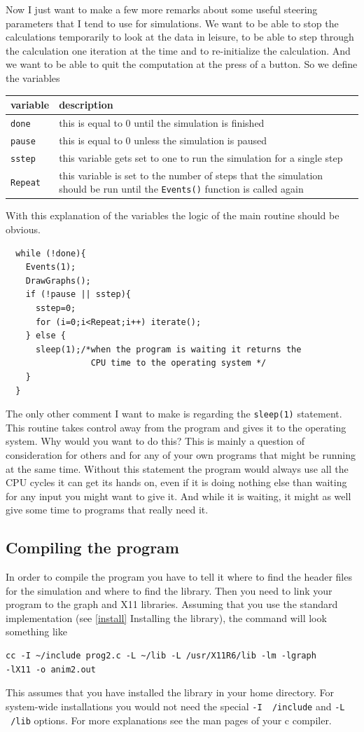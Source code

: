 \documentclass[12pt,letterpaper]{article}
\begin{document}
Now I just want to make a few more remarks about some useful steering
parameters that I tend to use for simulations. We want to be able to
stop the calculations temporarily to look at the data in leisure,
to be able to step through the calculation one iteration at the time and
to re-initialize the calculation. And we want to be able to quit the
computation at the press of a button. So we define the variables
\begin{center}
\begin{tabular}{|l|p{8cm}|}
\hline
variable & description \\
\hline
\texttt{done} & this is equal to 0 until the simulation is finished\\
\texttt{pause}& this is equal to 0 unless the simulation is paused\\
\texttt{sstep}& this variable gets set to one to run the simulation
for a single step\\
\texttt{Repeat}& this variable is set to the number of steps that the
simulation should be run until the \texttt{Events()} function is
called again\\
\hline
\end{tabular}
\end{center}
With this explanation of the variables the logic of the main routine
should be obvious.
\begin{verbatim}
  while (!done){
    Events(1);
    DrawGraphs();
    if (!pause || sstep){
      sstep=0;
      for (i=0;i<Repeat;i++) iterate();
    } else {
      sleep(1);/*when the program is waiting it returns the 
                 CPU time to the operating system */
    }
  }
\end{verbatim}
The only other comment I want to make is regarding the
\texttt{sleep(1)} statement. This routine takes control away from the
program and gives it to the operating system. Why would you want to do
this? This is mainly a question of consideration for others and for
any of your own programs that might be running at the same
time. Without this statement the program would always use all the CPU
cycles it can get its hands on, even if it is doing nothing else than
waiting for any input you might want to give it. And while it is
waiting, it might as well give some time to programs that really
need it.

\subsection{Compiling the program}
In order to compile the program you have to tell it where to find the
header files for the simulation and where to find the library. Then
you need to link your program to the graph and X11 libraries. Assuming
that you use the standard implementation (see \ref{install} Installing
the library), the command will look something like
\begin{verbatim}
cc -I ~/include prog2.c -L ~/lib -L /usr/X11R6/lib -lm -lgraph 
-lX11 -o anim2.out
\end{verbatim}
This assumes that you have installed the library in your home
directory. For system-wide installations you would not need the special
\texttt{-I ~/include} and \texttt{-L ~/lib} options. For more
explanations see the man pages of your c compiler.
\end{document}
